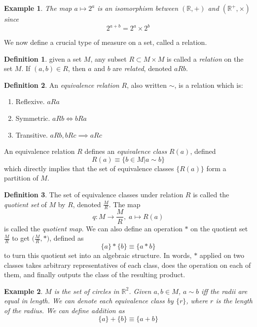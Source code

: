 \documentclass{article}
\newtheorem{example}{Example}[section]
\theoremstyle{remark}
\theoremstyle{definition}
\newtheorem{definition}{Definition}[section]
\begin{document}
\begin{example}
The map $a \mapsto 2^{a}$ is an isomorphism between $(\mathbb{R}, +)$ and $(\mathbb{R}^{+}, \times)$ since 
\[2^{a+b} = 2^a \times 2^b \]
\end{example}

We now define a crucial type of measure on a set, called a relation.  

\begin{definition}
given a set $M$, any subset $R \subset M \times M$ is called a \textit{relation} on the set $M$. If $(a, b) \in R$, then $a$ and $b$ are \textit{related}, denoted $a R b$. 
\end{definition}

\begin{definition}
An \textit{equivalence relation} $R$, also written $\sim$, is a relation which is:
\begin{enumerate}
    \item Reflexive. $a R a$ 
    \item Symmetric. $a R b \iff b R a$ 
    \item Transitive. $a R b, b R c \implies a R c$ 
\end{enumerate}
An equivalence relation $R$ defines an \textit{equivalence class} $R(a)$, defined 
\[ R(a) \equiv \{ b \in M | a\sim b \} \]
which directly implies that the set of equivalence classes $\{R(a)\}$ form a partition of $M$. 
\end{definition}

\begin{definition}
The set of equivalence classes under relation $R$ is called the \textit{quotient set} of $M$ by $R$, denoted $\frac{M}{R}$.
The map 
\[q: M \longrightarrow \frac{M}{R}, \; a \mapsto R(a)\] 
is called the \textit{quotient map}. We can also define an operation $*$ on the quotient set $\frac{M}{R}$ to get $\big( \frac{M}{R}, * \big)$, defined as
\[ \{a \} * \{ b \} \equiv \{ a * b \} \]
to turn this quotient set into an algebraic structure. In words, $*$ applied on two classes takes arbitrary representatives of each class, does the operation on each of them, and finally outputs the class of the resulting product. 
\end{definition}

\begin{example}
$M$ is the set of circles in $\mathbb{R}^{2}$. Given $a, b \in M$, $a \sim b$ iff the radii are equal in length. We can denote each equivalence class by $\{ r \}$, where $r$ is the length of the radius. We can define addition as 
\[ \{ a \} + \{ b \} \equiv \{ a + b\} \]
\end{example}
\end{document}
